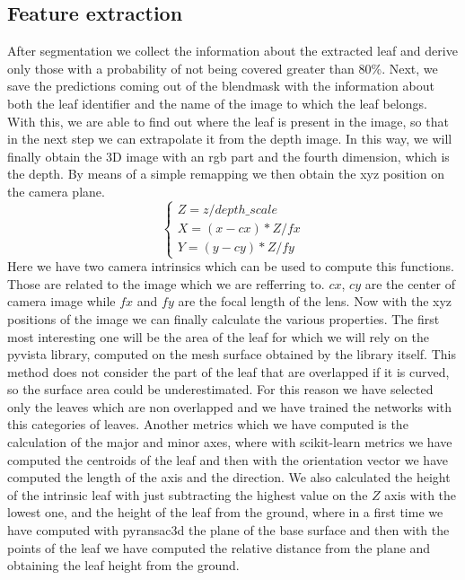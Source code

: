 \subsection{Feature extraction}
After segmentation we collect the information about the extracted leaf and derive only those with a probability of not being covered greater than 80\%.
Next, we save the predictions coming out of the blendmask with the information about both the leaf identifier and the name of the image to which the leaf belongs.
With this, we are able to find out where the leaf is present in the image, so that in the next step we can extrapolate it from the depth image. In this way, we will
finally obtain the 3D image with an rgb part and the fourth dimension, which is the depth. By means of a simple remapping we then obtain the xyz position on the camera plane.
$$
\begin{cases}
    Z = z / depth\_scale \\
    X = (x - cx) * Z / fx \\
    Y = (y - cy) * Z / fy
\end{cases}
$$
Here we have two camera intrinsics which can be used to compute this functions. Those are related to the image which we are refferring to. $cx$, $cy$ are the 
center of camera image while $fx$ and $fy$ are the focal length of the lens. Now with the xyz positions of the image we can finally calculate the various properties. The first
most interesting one will be the area of the leaf for which we will rely on the pyvista \cite{sullivan2019pyvista} library, computed on the mesh surface obtained by the
library itself. This method does not consider the part of the leaf that are overlapped if it is curved, so the surface area could be underestimated. For this reason we
have selected only the leaves which are non overlapped and we have trained the networks with this categories of leaves. Another metrics which we have computed is
the calculation of the major and minor axes, where with scikit-learn \cite{scikit-learn} metrics we have computed the centroids of the leaf and then with the
orientation vector we have computed the length of the axis and the direction. We also calculated the height of the intrinsic leaf with just subtracting the highest
value on the $Z$ axis with the lowest one, and the height of the leaf from the ground, where in a first time we have computed with pyransac3d the plane of the base surface and
then with the points of the leaf we have computed the relative distance from the plane and obtaining the leaf height from the ground.


